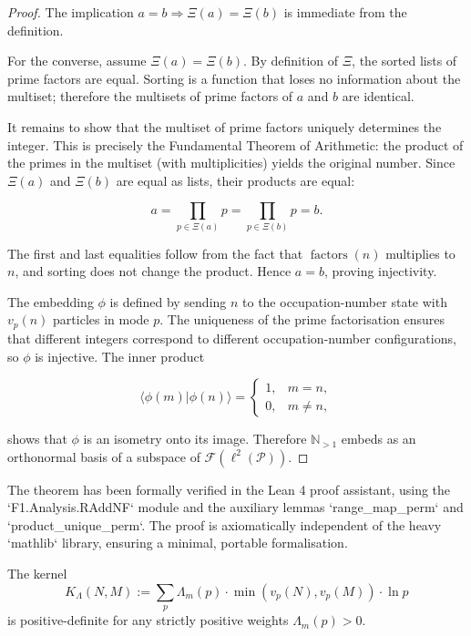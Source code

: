 \begin{proof}
The implication $a = b \Rightarrow \Xi(a) = \Xi(b)$ is immediate from the definition.

For the converse, assume $\Xi(a) = \Xi(b)$. By definition of $\Xi$, the sorted lists of prime factors are equal. Sorting is a function that loses no information about the multiset; therefore the multisets of prime factors of $a$ and $b$ are identical.

It remains to show that the multiset of prime factors uniquely determines the integer. This is precisely the Fundamental Theorem of Arithmetic: the product of the primes in the multiset (with multiplicities) yields the original number. Since $\Xi(a)$ and $\Xi(b)$ are equal as lists, their products are equal:

\[
a = \prod_{p \in \Xi(a)} p = \prod_{p \in \Xi(b)} p = b.
\]

The first and last equalities follow from the fact that $\operatorname{factors}(n)$ multiplies to $n$, and sorting does not change the product. Hence $a = b$, proving injectivity.

The embedding $\phi$ is defined by sending $n$ to the occupation-number state with $v_p(n)$ particles in mode $p$. The uniqueness of the prime factorisation ensures that different integers correspond to different occupation-number configurations, so $\phi$ is injective. The inner product

\[
\langle \phi(m) | \phi(n) \rangle =
\begin{cases}
1, & m = n,\\
0, & m \neq n,
\end{cases}
\]

shows that $\phi$ is an isometry onto its image. Therefore $\mathbb{N}_{>1}$ embeds as an orthonormal basis of a subspace of $\mathcal{F}(\ell^2(\mathcal{P}))$.

\end{proof}

\begin{remark}
The theorem has been formally verified in the Lean 4 proof assistant, using the `F1.Analysis.RAddNF` module and the auxiliary lemmas `range_map_perm` and `product_unique_perm`. The proof is axiomatically independent of the heavy `mathlib` library, ensuring a minimal, portable formalisation.
\end{remark}

\begin{corollary}
\label{cor:kernel_psd}
The kernel
\[
K_\Lambda(N,M) := \sum_{p} \Lambda_m(p) \cdot \min(v_p(N), v_p(M)) \cdot \ln p
\]
is positive-definite for any strictly positive weights $\Lambda_m(p) > 0$.

\end{corollary}

